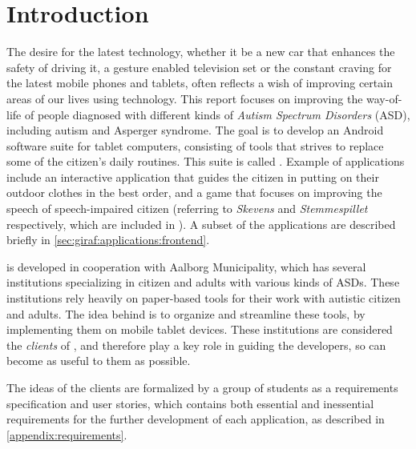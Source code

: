 \newcommand{\headerIntroduction}{Introduction}
\chapter*{\headerIntroduction}\label{chap:introduction}
\addcontentsline{toc}{chapter}{\headerIntroduction}

The desire for the latest technology, whether it be a new car that enhances the safety of driving it, a gesture enabled television set or the constant craving for the latest mobile phones and tablets, often reflects a wish of improving certain areas of our lives using technology.
This report focuses on improving the way-of-life of people diagnosed with different kinds of \textit{Autism Spectrum Disorders} (ASD), including autism and Asperger syndrome.
The goal is to develop an Android software suite for tablet computers, consisting of tools that strives to replace some of the citizen's daily routines. This suite is called \giraf.
Example of \giraf applications include an interactive application that guides the citizen in putting on their outdoor clothes in the best order, and a game that focuses on improving the speech of speech-impaired citizen (referring to \textit{Skevens} and \textit{Stemmespillet} respectively, which are included in \giraf).
A subset of the \giraf applications are described briefly in \cref{sec:giraf:applications:frontend}.

\giraf is developed in cooperation with Aalborg Municipality, which has several institutions specializing in citizen and adults with various kinds of ASDs.
These institutions rely heavily on paper-based tools for their work with autistic citizen and adults. 
The idea behind \giraf is to organize and streamline these tools, by implementing them on mobile tablet devices.
These institutions are considered the \textit{clients} of \giraf, and therefore play a key role in guiding the developers, so \giraf can become as useful to them as possible.

The ideas of the clients are formalized by a group of students as a requirements specification and user stories, which contains both essential and inessential requirements for the further development of each application, as described in \cref{appendix:requirements}.